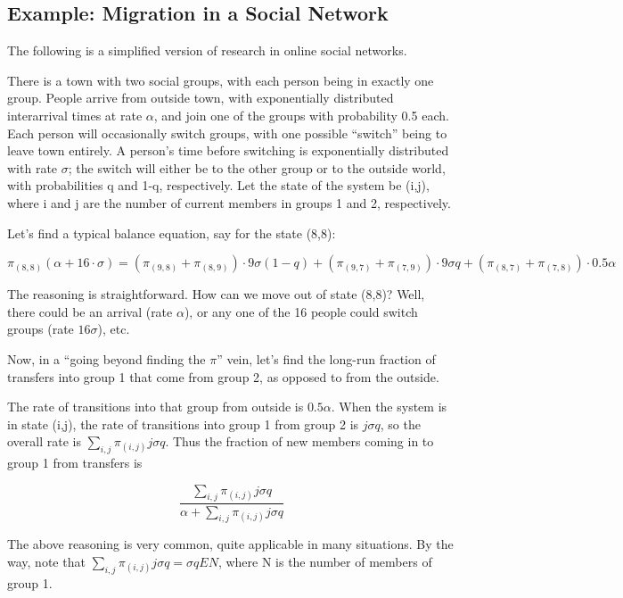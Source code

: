 \subsection{Example:  Migration in a Social Network}

The following is a simplified version of research in online social
networks.

There is a town with two social groups, with each person being in
exactly one group.  People arrive from outside town, with exponentially
distributed interarrival times at rate $\alpha$, and join one of the
groups with probability 0.5 each.  Each person will occasionally switch
groups, with one possible ``switch'' being to leave town entirely.  A
person's time before switching is exponentially distributed with rate
$\sigma$; the switch will either be to the other group or to the outside
world, with probabilities q and 1-q, respectively.  Let the state of the
system be (i,j), where i and j are the number of current members in
groups 1 and 2, respectively.

Let's find a typical balance equation, say for the state (8,8):

\begin{equation}
\pi_{(8,8)} (\alpha + 16 \cdot \sigma ) =
( \pi_{(9,8)} + \pi_{(8,9)}) \cdot 9 \sigma (1-q) +
( \pi_{(9,7)} + \pi_{(7,9)}) \cdot 9 \sigma q +
( \pi_{(8,7)} + \pi_{(7,8)}) \cdot 0.5 \alpha
\end{equation}

The reasoning is straightforward.  How can we move out of state (8,8)?
Well, there could be an arrival (rate $\alpha$), or any one of the 16
people could switch groups (rate $16 \sigma$), etc.

Now, in a ``going beyond finding the $\pi$'' vein, let's find the
long-run fraction of transfers into group 1 that come from group 2, as
opposed to from the outside.

The rate of transitions into that group from outside is $0.5 \alpha$.
When the system is in state (i,j), the rate of transitions into group 1
from group 2 is $j \sigma q$, so the overall rate is $\sum_{i,j}
\pi_{(i,j)} j \sigma q$.  Thus the fraction of new members coming in to
group 1 from transfers is

\begin{equation}
\frac{\sum_{i,j} \pi_{(i,j)} j \sigma q}
{\alpha + \sum_{i,j} \pi_{(i,j)} j \sigma q}
\end{equation}

The above reasoning is very common, quite applicable in many situations.
By the way, note that $\sum_{i,j} \pi_{(i,j)} j \sigma q = \sigma q EN$,
where N is the number of members of group 1.


